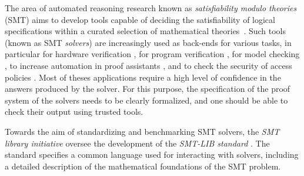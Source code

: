 \documentclass[class=llncs, crop=false]{standalone}
\begin{document}
%
The area of automated reasoning research known as
\emph{satisfiability modulo theories} (SMT)
aims to develop tools capable of deciding
the satisfiability of logical specifications
within a curated selection of mathematical theories~\cite{Barrett2021}.
%
%
Such tools (known as SMT \emph{solvers}) are increasingly used as
back-ends for various tasks, in particular for hardware verification
\cite{DBLP:conf/fmcad/MattareiMBDHH18}, for program verification
\cite{barnett06boogie,riant23debugging,kosmatov16frama-c}, for model
checking \cite{DBLP:conf/cav/ChampionMST16}, to increase automation in
proof assistants
\cite{DBLP:conf/cpp/ArmandFGKTW11,DBLP:journals/jar/BlanchetteBP13},
and to check the security of access policies \cite{Backes2018}. Most
of theses applications require a high level of confidence in the
answers produced by the solver. For this purpose, the specification of
the proof system of the solvers needs to be clearly formalized, and
one should be able to check their output using trusted tools.




Towards the aim of standardizing and benchmarking
 SMT solvers,
the \emph{SMT library initiative} oversee the development of
the \emph{SMT-LIB standard} \cite{Barrett2015-standard}.
%
The standard specifies a common language used
for interacting with solvers, including a detailed
description of the mathematical foundations of the SMT problem.


%

\end{document}
